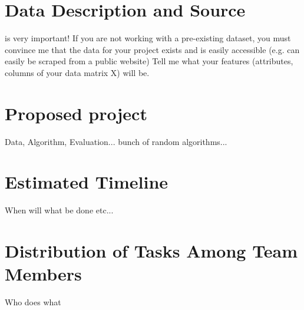 \documentclass[journal]{IEEEtran}
\begin{document}
\section{Data Description and Source}

 is very important! If you are not working with a pre-existing dataset, you must convince me that the data for your project exists and is easily accessible (e.g. can easily be scraped from a public website) Tell me what your features (attributes, columns of your data matrix X) will be.

\section{Proposed project}

Data, Algorithm, Evaluation... bunch of random algorithms...

\section{Estimated Timeline}

When will what be done etc...

\section{Distribution of Tasks Among Team Members}

Who does what
 
\newpage




\end{document}
